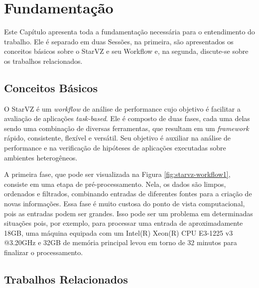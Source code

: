 \chapter{Fundamentação} \label{ch:fundamentation}

Este Capítulo apresenta toda a fundamentação necessária para o entendimento do trabalho. 
Ele é separado em duas Sessões, na primeira, são apresentados os conceitos básicos sobre 
o StarVZ e seu Workflow e, na segunda, discute-se sobre os trabalhos relacionados.

\section{Conceitos Básicos} \label{sect:basic-concepts}

O StarVZ \cite{ref:starvz} é um \emph{workflow} de análise de performance cujo objetivo é facilitar
a avaliação de aplicações \emph{task-based}. Ele é composto de duas fases, cada uma delas sendo uma 
combinação de diversas ferramentas, que resultam em um \emph{framework} rápido, consistente, flexível 
e versátil. Seu objetivo é auxiliar na análise de performance e na verificação de hipóteses de aplicações 
executadas sobre ambientes heterogêneos.

A primeira fase, que pode ser visualizada na Figura \ref{fig:starvz-workflow1}, consiste em uma etapa de pré-processamento.
Nela, os dados são limpos, ordenados e filtrados, combinando entradas de diferentes fontes para a criação de novas informações.
Essa fase é muito custosa do ponto de vista computacional, pois as entradas podem ser grandes. Isso pode ser um problema em 
determinadas situações pois, por exemplo, para processar uma entrada de aproximadamente 18GB, uma máquina equipada com um Intel(R)
Xeon(R) CPU E3-1225 v3 @3.20GHz e 32GB de memória principal levou em torno de 32 minutos para finalizar o processamento.

\section{Trabalhos Relacionados}\label{sect:related-work}